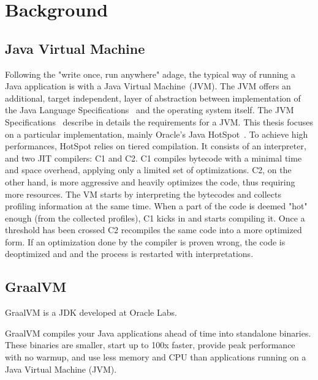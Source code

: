 \chapter{Background}

\section{Java Virtual Machine}
Following the "write once, run anywhere" adage, the typical way of running a Java application is with a Java Virtual Machine~(JVM).
The JVM offers an additional, target independent, layer of abstraction between implementation of 
the Java Language Specifications~\cite{noauthor_java_nodate} and the operating system itself. 
The JVM Specifications~\cite{noauthor_java_nodate-1} describe in details the requirements for a JVM. 
This thesis focuses on a particular implementation, mainly Oracle's Java HotSpot~\cite{noauthor_hotspot_nodate}. 
To achieve high performances, HotSpot relies on tiered compilation. It consists of an interpreter, and two JIT compilers: C1 and C2. 
C1 compiles bytecode with a minimal time and space overhead, applying only a limited set of optimizations. C2, on the other 
hand, is more aggressive and heavily optimizes the code, thus requiring more resources.
The VM starts by interpreting the bytecodes and collects profiling information at the same time. When a part of the code is 
deemed "hot" enough (from the collected profiles), C1 kicks in and starts compiling it. Once a threshold has been crossed C2 
recompiles the same code into a more optimized form. If an optimization done by the compiler is proven wrong, the code is 
deoptimized and and the process is restarted with interpretations.  

\section{GraalVM}
GraalVM is a JDK developed at Oracle Labs.

GraalVM compiles your Java applications ahead of time into standalone binaries. These binaries are smaller, start up to 100x faster, provide peak performance with no warmup, and use less memory and CPU than applications running on a Java Virtual Machine (JVM).

